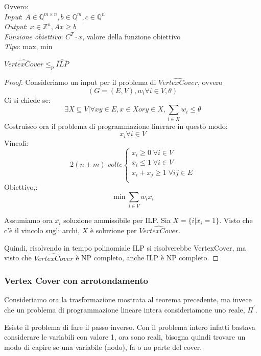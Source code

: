 Ovvero:\\
\emph{Input}: $A \in \mathbb{Q}^{m\times n}, b \in \mathbb{Q}^m, c \in \mathbb{Q}^n$\\
\emph{Output}: $x \in \mathbb{Z}^n, Ax \geq b$\\
\emph{Funzione obiettivo}: $C^T \cdot x$, valore della funzione obiettivo\\
\emph{Tipo}: max, min\\

\begin{theorem}
    $\hat{\mathit{VertexCover}} \leq_p \hat{\mathit{ILP}}$ 
\end{theorem}
\begin{proof}
    Consideriamo un input per il problema di $\hat{\mathit{VertexCover}}$, ovvero $$(G=(E,V), w_i \forall i \in V, \theta)$$
    Ci si chiede se: $$\exists X \subseteq V | \forall xy \in E, x \in X \mathit{or} y \in X, \sum_{i\in X} w_i \leq \theta$$
    Costruisco ora il problema di programmazione linerare in questo modo:
    $$x_i \forall i \in V$$
    Vincoli:
    \[
        2(n+m)\;\mathit{volte}
        \begin{cases}
            x_i \geq 0 \;\forall i \in V\\
            x_i \leq 1 \;\forall i \in V\\
            x_i + x_j \geq 1 \;\forall ij \in E\\
        \end{cases}
    \]
    Obiettivo,:
    $$\min \sum_{i\in V} w_ix_i$$

    Assumiamo ora $\bar{x_i}$ soluzione ammissibile per ILP. Sia $X = \{ i | \bar{x_i} = 1\}$.
    Visto che c'è il vincolo sugli archi, $X$ è soluzione per $\hat{\mathit{VertexCover}}$.

    Quindi, risolvendo in tempo polinomiale ILP si risolverebbe VertexCover, ma 
    visto che $\hat{\mathit{VertexCover}}$ è NP completo, anche ILP è NP completo.
\end{proof}

\subsubsection{Vertex Cover con arrotondamento}
Consideriamo ora la trasformazione mostrata al teorema precedente, ma invece
che un problema di programmazione lineare intera consideriamone uno reale, $\Pi^\prime$.

Esiste il problema di fare il passo inverso. Con il problema intero infatti 
bastava considerare le variabili con valore 1, ora sono reali, bisogna quindi trovare un 
modo di capire se una variabile (nodo), fa o no parte del cover.

